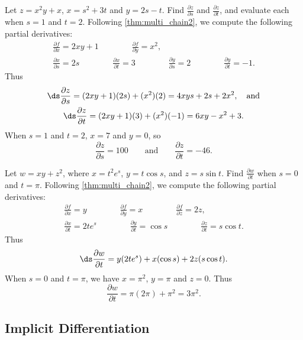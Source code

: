 
\begin{example}\label{ex_mchain3}%
Let $z=x^2y+x$, $x=s^2+3t$ and $y=2s-t$. Find $\frac{\partial z}{\partial s}$ and $\frac{\partial z}{\partial t}$, and evaluate each when $s=1$ and $t=2$.
\solution
Following \autoref{thm:multi_chain2}, we compute the following partial derivatives:
\begin{gather*}
\frac{\partial f}{\partial x} = 2xy+1\qquad\qquad \frac{\partial f}{\partial y} = x^2,\\
\frac{\partial x}{\partial s} = 2s \qquad\qquad \frac{\partial x}{\partial t} = 3\qquad\qquad \frac{\partial y}{\partial s} = 2 \qquad\qquad \frac{\partial y}{\partial t} = -1.
\end{gather*}
Thus 
\begin{gather*}
\ds \frac{\partial z}{\partial s} = (2xy+1)(2s) + (x^2)(2) = 4xys+2s + 2x^2,\quad \text{and}\\
\ds \frac{\partial z}{\partial t} = (2xy+1)(3) + (x^2)(-1) = 6xy-x^2+3.
\end{gather*}
When $s=1$ and $t=2$, $x= 7$ and $y= 0$, so 
\[\frac{\partial z}{\partial s} = 100\qquad \text{and}\qquad \frac{\partial z}{\partial t} = -46.\]
\end{example}

\begin{example}\label{ex_mchain4}%
Let $w = xy+z^2$, where $x= t^2e^s$, $y= t\cos s$, and $z=s\sin t$. Find $\frac{\partial w}{\partial t}$ when $s=0$ and $t=\pi$.
\solution
Following \autoref{thm:multi_chain2}, we compute the following partial derivatives:
\begin{gather*}
\frac{\partial f}{\partial x} = y\qquad\qquad \frac{\partial f}{\partial y} = x\qquad\qquad \frac{\partial f}{\partial z} = 2z,\\
\frac{\partial x}{\partial t} = 2te^s\qquad\qquad \frac{\partial y}{\partial t} = \cos s\qquad\qquad \frac{\partial z}{\partial t} = s\cos t.
\end{gather*}
Thus
\[\ds \frac{\partial w}{\partial t} = y(2te^s) + x(\cos s) + 2z(s\cos t).\] 
When $s=0$ and $t=\pi$, we have $x=\pi^2$, $y=\pi$ and $z=0$. Thus
\[\frac{\partial w}{\partial t} = \pi(2\pi) + \pi^2 = 3\pi^2.\]
\end{example}

\subsection{Implicit Differentiation}

